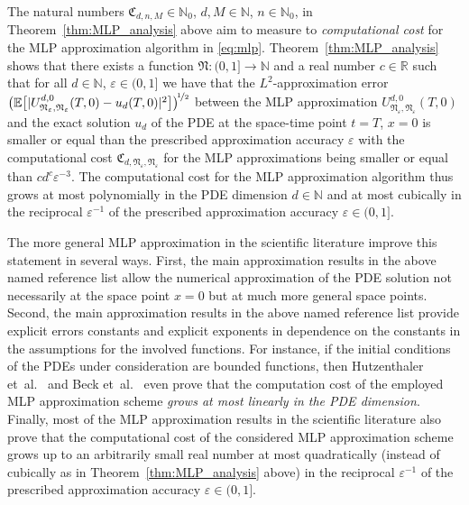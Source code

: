 \documentclass[12pt]{article}
\theoremstyle{definition}
\newcommand{\R}{\mathbb{R}}
\newcommand{\E}{\mathbb{E}}
\newcommand{\N}{\mathbb{N}}
\begin{document}
The natural numbers 
$ \mathfrak{C}_{ d, n, M } \in \N_0 $, 
$ d, M \in \N $, 
$ n \in \N_0 $,
in Theorem~\ref{thm:MLP_analysis} above 
aim to measure to 
\emph{computational cost} 
for the MLP approximation algorithm in \eqref{eq:mlp}. 
Theorem~\ref{thm:MLP_analysis} shows that 
there exists a function 
$ \mathfrak{N} \colon (0,1] \to \N $ 
and a real number $ c \in \R $ 
such that for all 
$ d \in \N $, $ \varepsilon \in (0,1] $ 
we have that 
the $ L^2 $-approximation error 
$
  \big(  
    \E\big[ 
      |
        U^{d,0}_{\mathfrak{N}_{\varepsilon},\mathfrak{N}_{\varepsilon}}(T,0)
        - 
        u_d(T,0)
      |^2
    \big]
  \big)^{\!\nicefrac12} 
$
between the MLP approximation 
$
  U^{d,0}_{\mathfrak{N}_{\varepsilon},\mathfrak{N}_{\varepsilon}}(T,0)
$
and the exact solution 
$ u_d $
of the PDE 
at the space-time point 
$ t = T $, $ x = 0 $
is smaller or equal than the 
prescribed approximation 
accuracy $ \varepsilon $ 
with the computational cost 
$
  \mathfrak{C}_{d,\mathfrak{N}_{\varepsilon},\mathfrak{N}_{\varepsilon}} 
$
for the MLP approximations 
being smaller or equal than 
$
  c d^c \varepsilon^{ - 3 }
$. 
The computational cost 
for the MLP approximation algorithm
thus grows at most polynomially 
in the PDE dimension $ d \in \N $ 
and at most cubically 
in the reciprocal $ \varepsilon^{ - 1 } $ 
of the prescribed approximation accuracy 
$ \varepsilon \in (0,1] $. 



The more general MLP approximation
\cite{Becketal2019MLP_nonlip_arXiv,
Hutzenthaleretal2018arXiv,
hutzenthaler2019arxiv1903,
giles2019generalised,
hutzenthaler2019arxiv1912,
hutzenthaler2020lipschitz}
%
%
%
%
%
%
%
%
%
%
%
%
in the scientific literature 
improve this statement in several ways. 
First, the main approximation results in the above named reference list 
allow the numerical approximation of the PDE solution not 
necessarily at the space point $ x = 0 $ 
but at much more general space points. 
Second, the main approximation results in the above named reference list
provide explicit errors constants and explicit exponents in dependence on the constants in 
the assumptions for the involved functions. 
For instance, if the initial conditions 
of the PDEs under consideration are bounded functions, then 
Hutzenthaler et~al.~\cite[Theorem~1.1]{Hutzenthaleretal2018arXiv} and 
Beck et~al.~\cite[Theorem~1.1]{Becketal2019MLP_nonlip_arXiv} 
even prove that the computation cost of the employed MLP approximation scheme 
\emph{grows at most linearly in the PDE dimension}. 
Finally, most of the MLP approximation results in the scientific literature also prove 
that the computational cost of the considered MLP approximation scheme 
grows up to an arbitrarily small real number 
%
at most quadratically (instead of cubically as in Theorem~\ref{thm:MLP_analysis} above) 
in the reciprocal $ \varepsilon^{ - 1 } $
of the prescribed approximation accuracy 
$ \varepsilon \in (0,1] $. 
\end{document}
